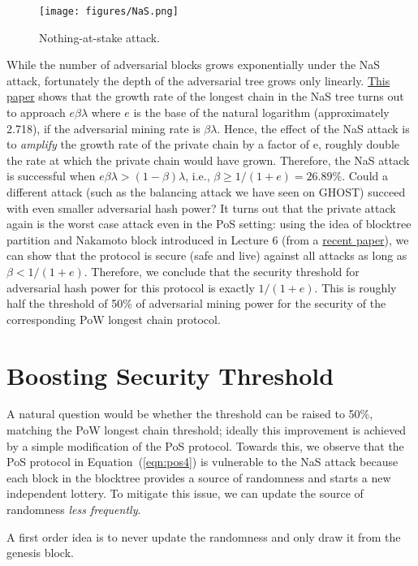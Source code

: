 \documentclass{article}
\begin{document}
\begin{figure}
    \centering
\texttt{[image: figures/NaS.png]}
\caption{Nothing-at-stake attack.}
\label{fig:nas}
\end{figure}

While the number of adversarial blocks grows exponentially under the NaS attack, fortunately the depth of the adversarial tree grows only linearly. \href{https://eprint.iacr.org/2017/656}{This paper} shows that the growth rate of the longest chain in the NaS tree turns out to approach $e\beta\lambda$ where $e$ is the base of the natural logarithm (approximately 2.718), if the adversarial mining rate is $\beta \lambda$. Hence, the effect of the NaS attack is to {\em amplify} the growth rate of the private chain by a factor of e, roughly double the rate at which the private chain would have grown. Therefore, the NaS attack is successful when $e\beta\lambda > (1-\beta)\lambda$, i.e., $\beta \geq 1/(1+e) = 26.89\%$.  Could a different attack (such as the balancing attack we have seen on {\sf GHOST}) succeed with even smaller adversarial hash power? It turns out that the private attack again is  the worst case attack even in the PoS setting: 
 using the idea of blocktree partition and Nakamoto block introduced in Lecture 6 (from a \href{https://arxiv.org/abs/2005.10484}{recent paper}), we can show that the protocol is secure (safe and live) against all attacks as long as $\beta < 1/(1+e)$. Therefore, we conclude that the security threshold for adversarial hash power for this protocol is exactly $ 1/(1+e)$. This is roughly half the threshold of 50\% of adversarial mining power for the security of the corresponding PoW longest chain protocol.

\section*{Boosting Security Threshold}
A natural question would be whether the threshold can be raised to 50\%, matching the PoW longest chain  threshold; ideally this improvement is achieved by a simple modification of the PoS protocol. Towards this, we observe that the PoS protocol in Equation~(\ref{eqn:pos4}) is vulnerable to the NaS attack because each block in the blocktree provides a source of randomness and starts a new independent lottery. To mitigate this issue, we can update the source of randomness {\em less frequently}. 

 A first order idea is to never update the randomness and only draw it from the genesis block.
\end{document}
